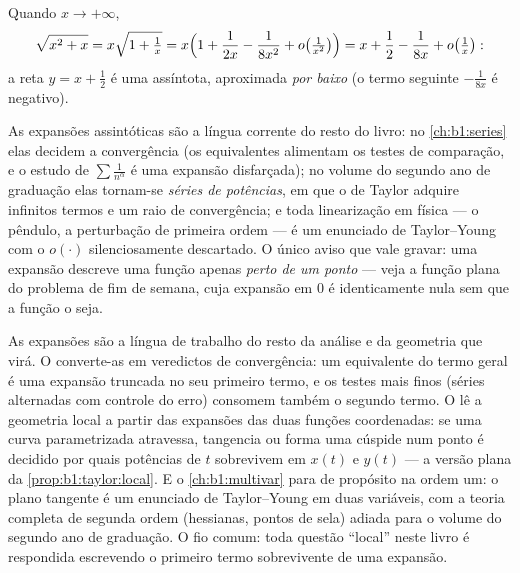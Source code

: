 \begin{example}\label{ex:b1:taylor:asymptote}
Quando $x \to +\infty$,
\[
\sqrt{x^2 + x} = x\sqrt{1 + \tfrac1x}
= x\Bigl(1 + \frac{1}{2x} - \frac{1}{8x^2} + o\bigl(\tfrac{1}{x^2}\bigr)\Bigr)
= x + \frac12 - \frac{1}{8x} + o\bigl(\tfrac 1x\bigr):
\]
a reta $y = x + \frac12$ é uma assíntota, aproximada \emph{por baixo} (o termo
seguinte $-\frac{1}{8x}$ é negativo).
\end{example}

\begin{remark}
As expansões assintóticas são a língua corrente do resto do livro: no
\cref{ch:b1:series} elas decidem a convergência (os equivalentes alimentam os testes
de comparação, e o estudo de $\sum
\frac{1}{n^\alpha}$ é uma expansão disfarçada); no
volume do segundo ano de graduação elas tornam-se \emph{séries de
potências}, em que o  de Taylor adquire infinitos termos e um
raio de convergência; e toda linearização em física --- o pêndulo, a
perturbação de primeira ordem --- é um enunciado de Taylor--Young com
o $o(\cdot)$ silenciosamente descartado. O único aviso que vale gravar: uma
expansão descreve uma função apenas \emph{perto de um ponto} --- veja
a função plana do problema de fim de semana, cuja expansão em $0$ é
identicamente nula sem que a função o seja.
\end{remark}

\begin{remark}
As expansões são a língua de trabalho do resto da análise e da
geometria que virá. O  converte-as em veredictos de convergência:
um equivalente do termo geral é uma expansão truncada no seu primeiro
termo, e os testes mais finos (séries alternadas com controle do erro)
consomem também o segundo termo. O  lê a geometria local a partir
das expansões das duas funções coordenadas: se uma curva parametrizada
atravessa, tangencia ou forma uma cúspide num ponto é decidido por
quais potências de $t$ sobrevivem em $x(t)$ e $y(t)$ --- a versão
plana da \cref{prop:b1:taylor:local}. E o \cref{ch:b1:multivar} para de propósito na ordem um: o plano
tangente é um enunciado de Taylor--Young em duas variáveis, com a
teoria completa de segunda ordem (hessianas, pontos de sela) adiada
para o volume do segundo ano de graduação. O fio comum: toda questão
``local'' neste livro é respondida escrevendo o primeiro termo
sobrevivente de uma expansão.
\end{remark}

